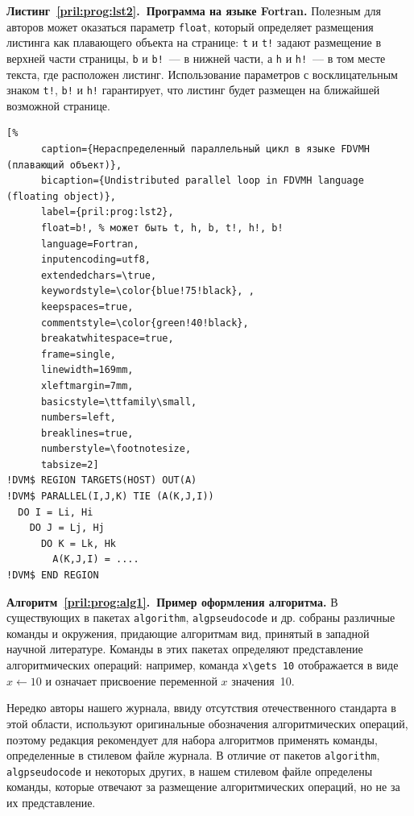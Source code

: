 \documentclass[10pt,a4paper]{book}
\begin{document}
\textbf{Листинг~\ref{pril:prog:lst2}.~Программа на языке Fortran.} 
Полезным для авторов может оказаться параметр \verb!float!, который определяет
размещения листинга как плавающего объекта на странице: 
\verb+t+ и \verb+t!+ задают размещение в верхней части страницы, 
\verb+b+ и \verb+b!+~--- в нижней части, 
а \verb+h+ и \verb+h!+~--- в том месте текста, где расположен листинг.
Использование параметров с восклицательным знаком \verb+t!+, \verb+b!+ и
\verb+h!+ гарантирует, что листинг будет размещен на ближайшей возможной странице.
%
%
\begin{lstlisting}[%
      caption={Нераспределенный параллельный цикл в языке FDVMH (плавающий объект)},
      bicaption={Undistributed parallel loop in FDVMH language (floating object)},
      label={pril:prog:lst2},
      float=b!, % может быть t, h, b, t!, h!, b!
      language=Fortran, 
      inputencoding=utf8, 
      extendedchars=\true, 
      keywordstyle=\color{blue!75!black}, , 
      keepspaces=true, 
      commentstyle=\color{green!40!black}, 
      breakatwhitespace=true,
      frame=single, 
      linewidth=169mm,
      xleftmargin=7mm,
      basicstyle=\ttfamily\small,
      numbers=left,
      breaklines=true, 
      numberstyle=\footnotesize,
      tabsize=2]  
!DVM$ REGION TARGETS(HOST) OUT(A)
!DVM$ PARALLEL(I,J,K) TIE (A(K,J,I)) 
  DO I = Li, Hi
    DO J = Lj, Hj
      DO K = Lk, Hk
        A(K,J,I) = ....
!DVM$ END REGION       
\end{lstlisting}

\smallskip
\textbf{Алгоритм~\ref{pril:prog:alg1}.~Пример оформления алгоритма.} 
В существующих в \LaTeXe{} пакетах \verb!algorithm!, \verb!algpseudocode! и др. 
собраны различные команды и окружения, придающие алгоритмам вид, принятый в
западной научной литературе. Команды в этих пакетах определяют представление
алгоритмических операций: например, команда \verb!x\gets 10! отображается
в виде $x\leftarrow 10$ и означает присвоение переменной $x$ значения~10.

Нередко авторы нашего журнала, ввиду отсутствия отечественного стандарта в этой области,
используют оригинальные обозначения алгоритмических операций, поэтому 
редакция рекомендует для набора алгоритмов применять команды, определенные 
в стилевом файле журнала. В отличие от пакетов \verb!algorithm!, \verb!algpseudocode! и 
некоторых других, в нашем стилевом файле определены команды, которые отвечают за
размещение алгоритмических операций, но не за их представление.
\end{document}
